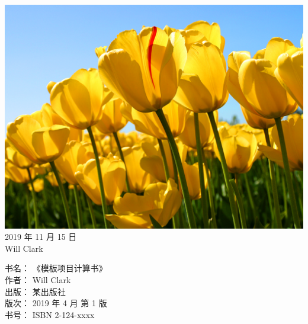 \documentclass[a4paper,UTF8]{book}
\begin{document}
\thispagestyle{empty}
\begin{center}
    \vspace*{3 cm}
    \\
    \vspace*{3 cm}
    \includegraphics[width = 3 in]{cover.jpg}\\
    \vspace*{5 cm}
    \Large {2019 年 11 月 15 日}\\
    \vspace*{0.5cm}
    Will Clark\\
\end{center}
\clearpage

\newpage
\thispagestyle{empty}
\noindent
书名： 《模板项目计算书》\\
作者： Will Clark\\
出版： 某出版社\\
版次： 2019 年 4 月 第 1 版\\
书号： ISBN 2-124-xxxx
\clearpage

\setcounter{page}{1}
\tableofcontents
\clearpage

\setcounter{page}{1}
\end{document}
